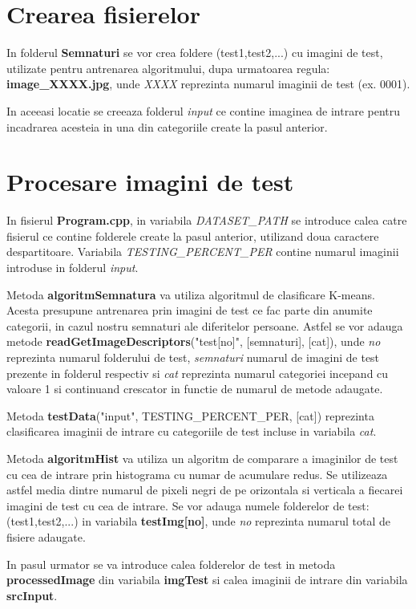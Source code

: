 \documentclass[conference]{IEEEtran}
\begin{document}
\section{Crearea fisierelor}
In folderul \textbf{Semnaturi} se vor crea foldere (test1,test2,...) cu imagini de test, utilizate pentru antrenarea algoritmului, dupa urmatoarea regula: \textbf{image\_XXXX.jpg}, unde \textit{XXXX} reprezinta numarul imaginii de test (ex. 0001).

In aceeasi locatie se creeaza folderul \textit{input} ce contine imaginea de intrare pentru incadrarea acesteia in una din categoriile create la pasul anterior.

\section{Procesare imagini de test}
In fisierul \textbf{Program.cpp}, in variabila \textit{DATASET\_PATH} se introduce calea catre fisierul ce contine folderele create la pasul anterior, utilizand doua caractere despartitoare. Variabila \textit{TESTING\_PERCENT\_PER} contine numarul imaginii introduse in folderul \textit{input}.

Metoda \textbf{algoritmSemnatura} va utiliza algoritmul de clasificare K-means. Acesta presupune antrenarea prin imagini de test ce fac parte din anumite categorii, in cazul nostru semnaturi ale diferitelor persoane. Astfel se vor adauga metode \textbf{readGetImageDescriptors}("test[no]", [semnaturi], [cat]), unde \textit{no} reprezinta numarul folderului de test, \textit{semnaturi} numarul de imagini de test prezente in folderul respectiv si \textit{cat} reprezinta numarul categoriei incepand cu valoare 1 si continuand crescator in functie de numarul de metode adaugate.

Metoda \textbf{testData}("input", TESTING\_PERCENT\_PER, [cat]) reprezinta clasificarea imaginii de intrare cu categoriile de test incluse in variabila \textit{cat}.

Metoda \textbf{algoritmHist} va utiliza un algoritm de comparare a imaginilor de test cu cea de intrare prin histograma cu numar de acumulare redus. Se utilizeaza astfel media dintre numarul de pixeli negri de pe orizontala si verticala a fiecarei imagini de test cu cea de intrare. Se vor adauga numele folderelor de test: (test1,test2,...) in variabila \textbf{testImg[no]}, unde \textit{no} reprezinta numarul total de fisiere adaugate.

In pasul urmator se va introduce calea folderelor de test in metoda \textbf{processedImage} din variabila \textbf{imgTest} si calea imaginii de intrare din variabila \textbf{srcInput}.
\end{document}
